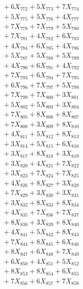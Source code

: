 \documentclass[a4paper,10pt]{article}
\begin{document}
{\begin{align}
&\;  + 6 X_{772} + 5 X_{773} + 7 X_{774} \\[0.3ex]
&\;  + 5 X_{775} + 5 X_{776} + 4 X_{777} \\[0.3ex]
&\;  + 7 X_{778} + 7 X_{779} + 5 X_{780} \\[0.3ex]
&\;  + 7 X_{781} + 4 X_{782} + 6 X_{783} \\[0.3ex]
&\;  + 4 X_{784} + 6 X_{785} + 4 X_{786} \\[0.3ex]
&\;  + 5 X_{787} + 5 X_{788} + 5 X_{789} \\[0.5ex]\allowbreak
&\;  + 4 X_{790} + 6 X_{791} + 4 X_{792} \\[0.3ex]
&\;  + 7 X_{793} + 6 X_{794} + 7 X_{795} \\[0.3ex]
&\;  + 6 X_{796} + 7 X_{797} + 5 X_{798} \\[0.3ex]
&\;  + 7 X_{799} + 7 X_{800} + 3 X_{801} \\[0.3ex]
&\;  + 5 X_{802} + 5 X_{803} + 3 X_{804} \\[0.3ex]
&\;  + 7 X_{805} + 8 X_{806} + 8 X_{807} \\[0.3ex]
&\;  + 7 X_{808} + 3 X_{809} + 8 X_{810} \\[0.3ex]
&\;  + 4 X_{811} + 5 X_{812} + 8 X_{813} \\[0.3ex]
&\;  + 3 X_{814} + 5 X_{815} + 6 X_{816} \\[0.3ex]
&\;  + 3 X_{817} + 8 X_{818} + 3 X_{819} \\[0.5ex]\allowbreak
&\;  + 3 X_{820} + 4 X_{821} + 7 X_{822} \\[0.3ex]
&\;  + 3 X_{823} + 7 X_{824} + 7 X_{825} \\[0.3ex]
&\;  + 4 X_{826} + 8 X_{827} + 3 X_{828} \\[0.3ex]
&\;  + 7 X_{829} + 3 X_{830} + 3 X_{831} \\[0.3ex]
&\;  + 3 X_{832} + 8 X_{833} + 8 X_{834} \\[0.3ex]
&\;  + 4 X_{835} + 7 X_{836} + 7 X_{837} \\[0.3ex]
&\;  + 8 X_{838} + 3 X_{839} + 8 X_{840} \\[0.3ex]
&\;  + 4 X_{841} + 5 X_{842} + 8 X_{843} \\[0.3ex]
&\;  + 7 X_{844} + 8 X_{845} + 6 X_{846} \\[0.3ex]
&\;  + 8 X_{847} + 6 X_{848} + 7 X_{849} \\[0.5ex]\allowbreak
&\;  + 6 X_{850} + 4 X_{851} + 5 X_{852} \\[0.3ex]
&\;  + 8 X_{853} + 8 X_{854} + 6 X_{855} \\[0.3ex]
&\;  + 7 X_{856} + 6 X_{857} + 7 X_{858} \\[0.3ex]

\end{align}}
\end{document}
